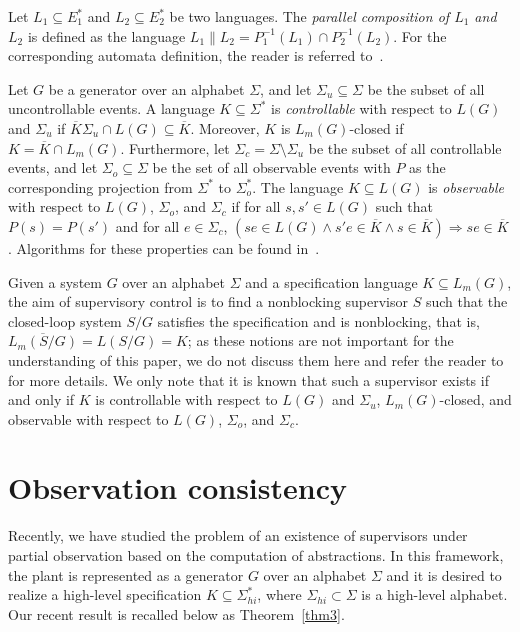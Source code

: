 \documentclass[preprint,1p,times]{elsarticle}
\begin{document}
	Let $L_1\subseteq E_1^*$ and $L_2\subseteq E_2^*$ be two languages. The {\em parallel composition of $L_1$ and $L_2$\/} is defined as the language $L_1\parallel L_2 = P_1^{-1}(L_1) \cap P_2^{-1}(L_2)$. For the corresponding automata definition, the reader is referred to~\cite{CL08}. 

  Let $G$ be a generator over an alphabet $\Sigma$, and let $\Sigma_u\subseteq \Sigma$ be the subset of all uncontrollable events. A language $K\subseteq\Sigma^*$ is {\em controllable} with respect to $L(G)$ and $\Sigma_u$ if $\overline{K}\Sigma_u\cap L(G)\subseteq \overline{K}$. Moreover, $K$ is $L_m(G)$-closed if $K = \overline K \cap L_m(G)$. Furthermore, let $\Sigma_c=\Sigma\setminus\Sigma_u$ be the subset of all controllable events, and let $\Sigma_o\subseteq\Sigma$ be the set of all observable events with $P$ as the corresponding projection from $\Sigma^*$ to $\Sigma_o^*$. The language $K\subseteq L(G)$ is {\em observable\/} with respect to $L(G)$, $\Sigma_o$, and $\Sigma_c$ if for all $s,s'\in L(G)$ such that $P(s)=P(s')$ and for all $e\in \Sigma_c$, $(se \in L(G) \wedge s'e \in \overline{K} \wedge s \in \overline{K}) \Rightarrow se \in \overline{K}$. Algorithms for these properties can be found in~\cite{CL08}.

  Given a system $G$ over an alphabet $\Sigma$ and a specification language $K\subseteq L_m(G)$, the aim of supervisory control is to find a nonblocking supervisor $S$ such that the closed-loop system $S/G$ satisfies the specification and is nonblocking, that is, $\overline{L_m(S/G)} = L(S/G)=K$; as these notions are not important for the understanding of this paper, we do not discuss them here and refer the reader to~\cite{CL08,Won04} for more details. We only note that it is known that such a supervisor exists if and only if $K$ is controllable with respect to $L(G)$ and $\Sigma_u$, $L_m(G)$-closed, and observable with respect to $L(G)$, $\Sigma_o$, and $\Sigma_c$. 


\section{Observation consistency}
  Recently, we have studied the problem of an existence of supervisors under partial observation based on the computation of abstractions. In this framework, the plant is represented as a generator $G$ over an alphabet $\Sigma$ and it is desired to realize a high-level specification $K \subseteq \Sigma_{hi}^*$, where $\Sigma_{hi}\subset\Sigma$ is a high-level alphabet. Our recent result is recalled below as Theorem~\ref{thm3}. 
  
\end{document}
